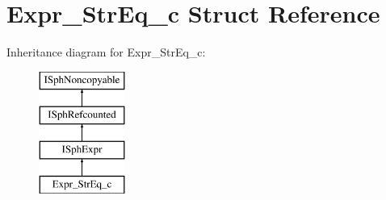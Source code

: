 \hypertarget{structExpr__StrEq__c}{\section{Expr\-\_\-\-Str\-Eq\-\_\-c Struct Reference}
\label{structExpr__StrEq__c}
}
Inheritance diagram for Expr\-\_\-\-Str\-Eq\-\_\-c\-:\begin{figure}[H]
\begin{center}
\leavevmode
\includegraphics[height=4.000000cm]{structExpr__StrEq__c}
\end{center}
\end{figure}
